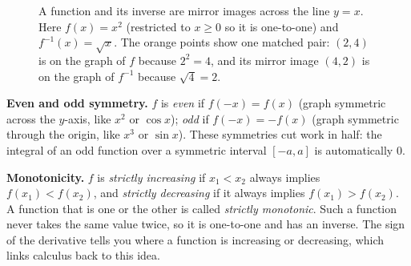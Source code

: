 \begin{figure}[htbp]
\centering
{}
\caption{A function and its inverse are mirror images across the line $y=x$. Here
$f(x)=x^2$ (restricted to $x\ge0$ so it is one-to-one) and $f^{-1}(x)=\sqrt x$.
The orange points show one matched pair: $(2,4)$ is on the graph of $f$ because
$2^2=4$, and its mirror image $(4,2)$ is on the graph of $f^{-1}$ because
$\sqrt4=2$.}
\label{ch40:fig-inverse}
\end{figure}

\textbf{Even and odd symmetry.} $f$ is \emph{even} if $f(-x)=f(x)$ (graph
symmetric across the $y$-axis, like $x^2$ or $\cos x$); \emph{odd} if
$f(-x)=-f(x)$ (graph symmetric through the origin, like $x^3$ or $\sin x$). These
symmetries cut work in half: the integral of an odd function over a symmetric
interval $[-a,a]$ is automatically $0$.

\textbf{Monotonicity.} $f$ is \emph{strictly increasing} if $x_1<x_2$ always
implies $f(x_1)<f(x_2)$, and \emph{strictly decreasing} if it always implies
$f(x_1)>f(x_2)$. A function that is one or the other is called \emph{strictly
monotonic}. Such a function never takes the same value twice, so it is
one-to-one and has an inverse. The sign of the derivative tells you where a
function is increasing or decreasing, which links calculus back to this idea.

